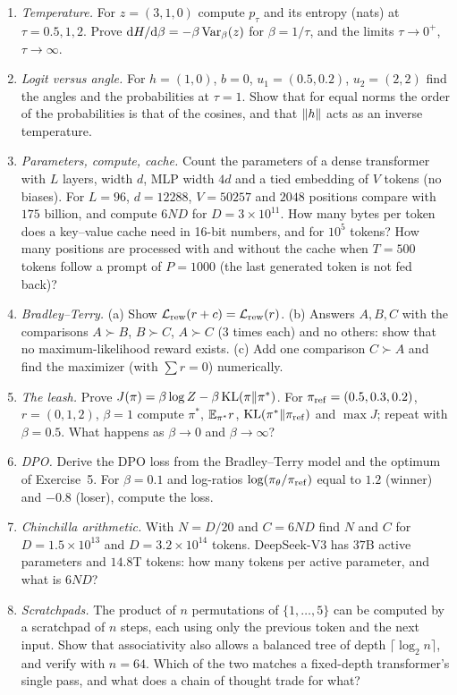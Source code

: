 \begin{exercise}[Problems]
\begin{enumerate}
  \item \emph{Temperature.} For $z=(3,1,0)$ compute $p_\tau$ and its entropy (nats) at $\tau=0.5,1,2$. Prove $\mathrm{d} H/\mathrm{d}\beta=-\beta\operatorname{Var}_\beta(z)$ for $\beta=1/\tau$, and the limits $\tau\to0^+$, $\tau\to\infty$.
  \item \emph{Logit versus angle.} For $h=(1,0)$, $b=0$, $u_1=(0.5,0.2)$, $u_2=(2,2)$ find the angles and the probabilities at $\tau=1$. Show that for equal norms the order of the probabilities is that of the cosines, and that $\left\lVert h\right\rVert$ acts as an inverse temperature.
  \item \emph{Parameters, compute, cache.} Count the parameters of a dense transformer with $L$ layers, width $d$, MLP width $4d$ and a tied embedding of $V$ tokens (no biases). For $L=96$, $d=12288$, $V=50257$ and $2048$ positions compare with $175$ billion, and compute $6ND$ for $D=3\times10^{11}$. How many bytes per token does a key--value cache need in 16-bit numbers, and for $10^5$ tokens? How many positions are processed with and without the cache when $T=500$ tokens follow a prompt of $P=1000$ (the last generated token is not fed back)?
  \item \emph{Bradley--Terry.} (a) Show $\mathcal{L}_{\mathrm{rew}}(r+c)=\mathcal{L}_{\mathrm{rew}}(r)$. (b) Answers $A,B,C$ with the comparisons $A\succ B$, $B\succ C$, $A\succ C$ ($3$ times each) and no others: show that no maximum-likelihood reward exists. (c) Add one comparison $C\succ A$ and find the maximizer (with $\sum r=0$) numerically.
  \item \emph{The leash.} Prove $J(\pi)=\beta\log Z-\beta\operatorname{KL}(\pi\|\pi^*)$. For $\pi_{\mathrm{ref}}=(0.5,0.3,0.2)$, $r=(0,1,2)$, $\beta=1$ compute $\pi^*$, $\mathbb{E}_{\pi^*}r$, $\operatorname{KL}(\pi^*\|\pi_{\mathrm{ref}})$ and $\max J$; repeat with $\beta=0.5$. What happens as $\beta\to0$ and $\beta\to\infty$?
  \item \emph{DPO.} Derive the DPO loss from the Bradley--Terry model and the optimum of Exercise~5. For $\beta=0.1$ and log-ratios $\log(\pi_\theta/\pi_{\mathrm{ref}})$ equal to $1.2$ (winner) and $-0.8$ (loser), compute the loss.
  \item \emph{Chinchilla arithmetic.} With $N=D/20$ and $C=6ND$ find $N$ and $C$ for $D=1.5\times10^{13}$ and $D=3.2\times10^{14}$ tokens. DeepSeek-V3 has $37$B active parameters and $14.8$T tokens: how many tokens per active parameter, and what is $6ND$?
  \item \emph{Scratchpads.} The product of $n$ permutations of $\{1,\dots,5\}$ can be computed by a scratchpad of $n$ steps, each using only the previous token and the next input. Show that associativity also allows a balanced tree of depth $\lceil\log_2n\rceil$, and verify with $n=64$. Which of the two matches a fixed-depth transformer's single pass, and what does a chain of thought trade for what?

\end{enumerate}
\end{exercise}

